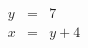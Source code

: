 \documentclass[preview,margin={1pt 1pt 1pt -13pt}]{standalone}
\begin{document}
\begin{varwidth}{\linewidth}
 \begin{eqnarray*}
y &=& 7 \\
x &=& y + 4
\end{eqnarray*}

\end{varwidth}
\end{document}
